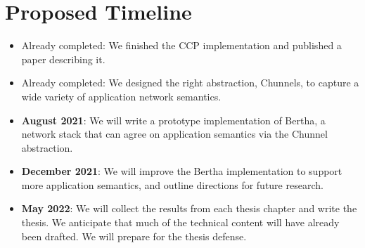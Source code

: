 \documentclass[fontsize=12pt,paper=letter]{scrartcl}
\newcommand{\tunnel}{Chunnel\xspace}
\newcommand{\tunnels}{Chunnels\xspace}
\begin{document}
\section{Proposed Timeline}

\begin{itemize}
    \item Already completed: We finished the CCP implementation and published a paper describing it. 
    \item Already completed: We designed the right abstraction, \tunnels, to capture a wide variety of application network semantics.
    \item \textbf{August 2021}: We will write a prototype implementation of Bertha, a network stack that can agree on application semantics via the \tunnel abstraction.
    \item \textbf{December 2021}: We will improve the Bertha implementation to support more application semantics, and outline directions for future research.
    \item \textbf{May 2022}: We will collect the results from each thesis chapter and write the thesis. We anticipate that much of the technical content will have already been drafted. We will prepare for the thesis defense.
\end{itemize}


\begin{small}

\end{small}
\end{document}
